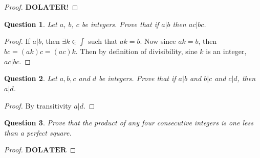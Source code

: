 \documentclass[11pt,oneside]{article}
\newtheorem{question}{Question}
\begin{document}
\begin{proof}
	$\mathbf{DO LATER!}$
\end{proof}

\begin{question}
	Let $a$, $b$, $c$ be integers. Prove that if $a | b$ then $ac | bc$.
\end{question}
\begin{proof}
	If $a | b$, then $\exists k \in \int$ such that $ak = b$.
	Now since $ak = b$, then $bc = (ak)c = (ac)k$. Then by definition of divisibility, sine $k$ is an integer, $ac|bc$.
\end{proof}

\begin{question}
	Let $a, b, c$ and $d$ be integers. Prove that if $a|b$ and $b|c$ and $c|d$, then $a|d$.
\end{question}
\begin{proof}
	By transitivity $a|d$.
\end{proof}

\begin{question}
	Prove that the product of any four consecutive integers is one less than a perfect square.
\end{question}
\begin{proof}
	$\mathbf{DO LATER}$
\end{proof}
\end{document}
